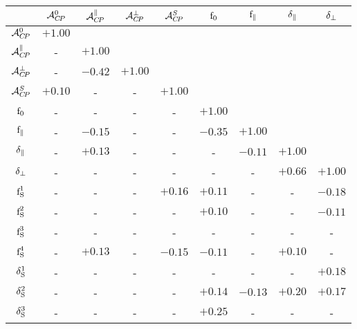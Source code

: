 \begin{table}
\centering
\footnotesize
\begin{tabular}{ccccccccc}
  \hline
  & $\mathcal{A}_{C\!P}^{0}$ & $\mathcal{A}_{C\!P}^{\parallel}$ & $\mathcal{A}_{C\!P}^{\perp}$ & $\mathcal{A}_{C\!P}^{S}$ & $\text{f}_{0}$ & $\text{f}_{\parallel}$ & $\delta_{\parallel}$ & $\delta_{\perp}$  \\
  \hline
$             \mathcal{A}_{C\!P}^{0}$ &  $+1.00$ &          &          &          &          &          &          &           \\
$     \mathcal{A}_{C\!P}^{\parallel}$ &     -    &  $+1.00$ &          &          &          &          &          &           \\
$         \mathcal{A}_{C\!P}^{\perp}$ &     -    &  $-0.42$ &  $+1.00$ &          &          &          &          &           \\
$             \mathcal{A}_{C\!P}^{S}$ &  $+0.10$ &     -    &     -    &  $+1.00$ &          &          &          &           \\
$              \text{f}_{0}$ &     -    &     -    &     -    &     -    &  $+1.00$ &          &          &           \\
$      \text{f}_{\parallel}$ &     -    &  $-0.15$ &     -    &     -    &  $-0.35$ &  $+1.00$ &          &           \\
$\delta_{\parallel}$ &     -    &  $+0.13$ &     -    &     -    &     -    &  $-0.11$ &  $+1.00$ &           \\
$    \delta_{\perp}$ &     -    &     -    &     -    &     -    &     -    &     -    &  $+0.66$ &  $+1.00$  \\
$              \text{f}_{\text{S}}^{1}$ &     -    &     -    &     -    &  $+0.16$ &  $+0.11$ &     -    &     -    &  $-0.18$  \\
$              \text{f}_{\text{S}}^{2}$ &     -    &     -    &     -    &     -    &  $+0.10$ &     -    &     -    &  $-0.11$  \\
$              \text{f}_{\text{S}}^{3}$ &     -    &     -    &     -    &     -    &     -    &     -    &     -    &     -     \\
$              \text{f}_{\text{S}}^{4}$ &     -    &  $+0.13$ &     -    &  $-0.15$ &  $-0.11$ &     -    &  $+0.10$ &     -     \\
$          \delta_{\text{S}}^{1}$ &     -    &     -    &     -    &     -    &     -    &     -    &     -    &  $+0.18$  \\
$          \delta_{\text{S}}^{2}$ &     -    &     -    &     -    &     -    &  $+0.14$ &  $-0.13$ &  $+0.20$ &  $+0.17$  \\
$          \delta_{\text{S}}^{3}$ &     -    &     -    &     -    &     -    &  $+0.25$ &     -    &     -    &     -     \\

\end{tabular}
\end{table}
